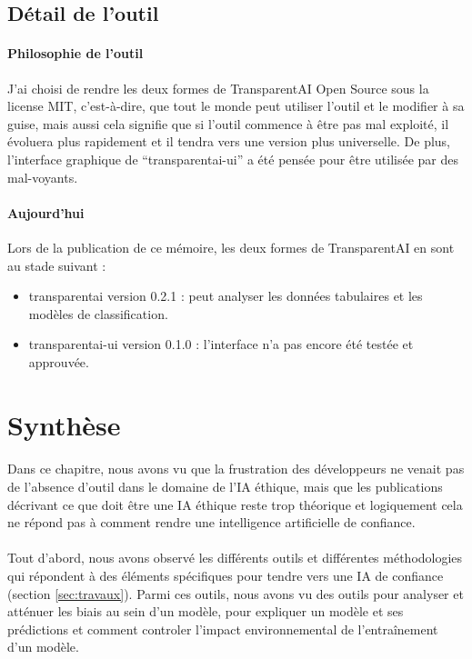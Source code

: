 \documentclass[10pt, french, a4paper]{report}
\begin{document}
\subsection{Détail de l'outil}

\paragraph{Philosophie de l'outil}
J'ai choisi de rendre les deux formes de TransparentAI Open Source sous la license MIT, c'est-à-dire, que tout le monde peut utiliser l'outil et le modifier à sa guise, mais aussi cela signifie que si l'outil commence à être pas mal exploité, il évoluera plus rapidement et il tendra vers une version plus universelle. De plus, l'interface graphique de ``transparentai-ui'' a été pensée pour être utilisée par des mal-voyants.

\paragraph{Aujourd’hui}
Lors de la publication de ce mémoire, les deux formes de TransparentAI en sont au stade suivant :
\begin{itemize}
  \item transparentai version 0.2.1 : peut analyser les données tabulaires et les modèles de classification.
  \item transparentai-ui version 0.1.0 : l'interface n'a pas encore été testée et approuvée.
\end{itemize}  

\section{Synthèse}

\paragraph{}
Dans ce chapitre, nous avons vu que la frustration des développeurs ne venait pas de l'absence d'outil dans le domaine de l'IA éthique, mais que les publications décrivant ce que doit être une IA éthique reste trop théorique et logiquement cela ne répond pas à comment rendre une intelligence artificielle de confiance. 

\paragraph{}
Tout d'abord, nous avons observé les différents outils et différentes méthodologies qui répondent à des éléments spécifiques pour tendre vers une IA de confiance (section \ref{sec:travaux}). Parmi ces outils, nous avons vu des outils pour analyser et atténuer les biais au sein d'un modèle, pour expliquer un modèle et ses prédictions et comment controler l'impact environnemental de l'entraînement d'un modèle.
\end{document}
